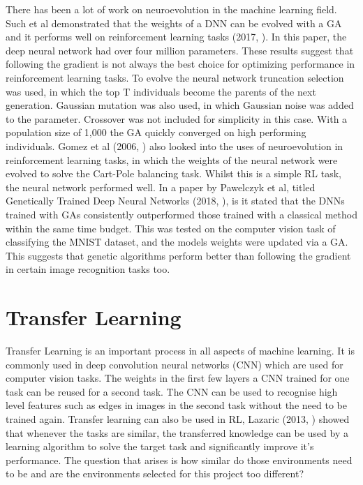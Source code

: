 There has been a lot of work on neuroevolution in the machine learning field. Such et al demonstrated that the weights of a DNN can be evolved with a GA and it performs well on reinforcement learning tasks (2017, \cite{such}). In this paper, the deep neural network had over four million parameters. These results suggest that following the gradient is not always the best choice for optimizing performance in reinforcement learning tasks. To evolve the neural network truncation selection was used, in which the top T individuals become the parents of the next generation. Gaussian mutation was also used, in which Gaussian noise was added to the parameter. Crossover was not included for simplicity in this case. With a population size of 1,000 the GA quickly converged on high performing individuals. Gomez et al (2006, \cite{gomez}) also looked into the uses of neuroevolution in reinforcement learning tasks, in which the weights of the neural network were evolved to solve the Cart-Pole balancing task. Whilst this is a simple RL task, the neural network performed well. In a paper by Pawelczyk et al, titled Genetically Trained Deep Neural Networks (2018, \cite{pawelczyk}), is it stated that the DNNs trained with GAs consistently outperformed those trained with a classical method within the same time budget. This was tested on the computer vision task of classifying the MNIST dataset, and the models weights were updated via a GA. This suggests that genetic algorithms perform better than following the gradient in certain image recognition tasks too.

\section{Transfer Learning}

Transfer Learning is an important process in all aspects of machine learning. It is commonly used in deep convolution neural networks (CNN) which are used for computer vision tasks. The weights in the first few layers a CNN trained for one task can be reused for a second task. The CNN can be used to recognise high level features such as edges in images in the second task without the need to be trained again. Transfer learning can also be used in RL, Lazaric (2013, \cite{lazaric}) showed that whenever the tasks are similar, the transferred knowledge can be used by a learning algorithm to solve the target task and significantly improve it's performance. The question that arises is how similar do those environments need to be and are the environments selected for this project too different?
